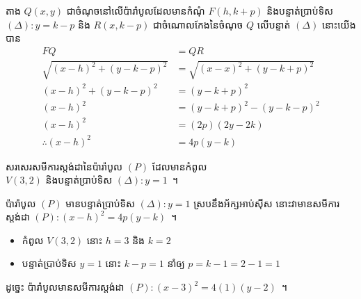 \begin{figure}[H]
\begin{subfigure}[t]{.5\textwidth}
	\end{subfigure}
\end{figure}
%
\begin{answer}
	តាង $ Q(x,y) $ ជាចំណុចនៅលើប៉ារ៉ាបូលដែលមានកំណុំ $ F(h,k+p) $ និងបន្ទាត់ប្រាប់ទិស $ (\Delta):y=k-p $ និង $ R(x,k-p) $ ជាចំណោលកែងនៃចំណុច $ Q $ លើបន្ទាត់ $ (\Delta) $ នោះយើងបាន
	\begin{align*}
		FQ &= QR\\
		\sqrt{(x-h)^2+(y-k-p)^2} &= \sqrt{(x-x)^2+(y-k+p)^2}\\
		(x-h)^2+(y-k-p)^2 &= (y-k+p)^2\\
		(x-h)^2 &= (y-k+p)^2-(y-k-p)^2\\
		(x-h)^2 &= (2p)(2y-2k)\\
		\therefore (x-h)^2 &= 4p(y-k)
	\end{align*}
\end{answer}
%
\begin{example*}
	សរសេរសមីការស្តង់ដានៃប៉ារ៉ាបូល $ (P) $ ដែលមានកំពូល\\ $ V(3,2) $ និងបន្ទាត់ប្រាប់ទិស $ (\Delta):y=1 $~។
\end{example*}
%
\begin{answer}
	ប៉ារ៉ាបូល $ (P) $ មានបន្ទាត់ប្រាប់ទិស $ (\Delta):y=1 $ ស្របនឹងអ័ក្សអាប់ស៊ីស​ នោះវាមានសមីការស្តង់ដា $ (P):(x-h)^2=4p(y-k) $~។
	\begin{itemize}
		\item កំពូល $ V(3,2) $ នោះ $ h=3 $ និង $ k=2 $
		\item បន្ទាត់ប្រាប់ទិស $ y=1 $ នោះ $ k-p=1 $ នាំឲ្យ $ p=k-1=2-1=1 $
	\end{itemize}
	ដូច្នេះ ប៉ារ៉ាបូលមានសមីការស្តង់ដា $ (P):(x-3)^2=4(1)(y-2) $~។
\end{answer}
